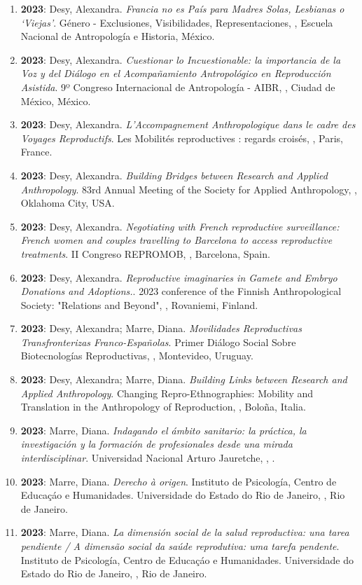 \begin{enumerate}
\item {\bf 2023}: Desy, Alexandra. {\it Francia no es País para Madres Solas, Lesbianas o ‘Viejas’}. Género - Exclusiones, Visibilidades, Representaciones, , Escuela Nacional de Antropología e Historia, México.\filbreak
\item {\bf 2023}: Desy, Alexandra. {\it Cuestionar lo Incuestionable: la importancia de la Voz y del Diálogo en el Acompañamiento Antropológico en Reproducción Asistida}. 9º Congreso Internacional de Antropología - AIBR, , Ciudad de México, México.\filbreak
\item {\bf 2023}: Desy, Alexandra. {\it L'Accompagnement Anthropologique dans le cadre des Voyages Reproductifs}. Les Mobilités reproductives : regards croisés, , Paris, France.\filbreak
\item {\bf 2023}: Desy, Alexandra. {\it Building Bridges between Research and Applied Anthropology}. 83rd Annual Meeting of the Society for Applied Anthropology, , Oklahoma City, USA.\filbreak
\item {\bf 2023}: Desy, Alexandra. {\it Negotiating with French reproductive surveillance: French women and couples travelling to Barcelona to access reproductive treatments}. II Congreso REPROMOB, , Barcelona, Spain.\filbreak
\item {\bf 2023}: Desy, Alexandra. {\it Reproductive imaginaries in Gamete and Embryo Donations and Adoptions.}. 2023 conference of the Finnish Anthropological Society: "Relations and Beyond", , Rovaniemi, Finland.\filbreak
\item {\bf 2023}: Desy, Alexandra; Marre, Diana. {\it Movilidades Reproductivas Transfronterizas Franco-Españolas}. Primer Diálogo Social Sobre Biotecnologías Reproductivas, , Montevideo, Uruguay.\filbreak
\item {\bf 2023}: Desy, Alexandra; Marre, Diana. {\it Building Links between Research and Applied Anthropology}. Changing Repro-Ethnographies: Mobility and Translation in the Anthropology of Reproduction, , Boloña, Italia.\filbreak
\item {\bf 2023}: Marre, Diana. {\it Indagando el ámbito sanitario: la práctica, la investigación y la formación de profesionales desde una mirada interdisciplinar}. Universidad Nacional Arturo Jauretche, , .\filbreak
\item {\bf 2023}: Marre, Diana. {\it Derecho à origen}. Instituto de Psicología, Centro de Educaçáo e Humanidades. Universidade do Estado do Rio de Janeiro, , Rio de Janeiro.\filbreak
\item {\bf 2023}: Marre, Diana. {\it La dimensión social de la salud reproductiva: una tarea pendiente / A dimensão social da saúde reprodutiva: uma tarefa pendente}. Instituto de Psicología, Centro de Educaçáo e Humanidades. Universidade do Estado do Rio de Janeiro, , Rio de Janeiro.\filbreak

\end{enumerate}
